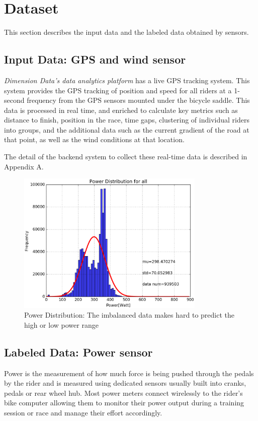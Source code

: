 \documentclass[runningheads]{llncs}
\begin{document}
\section{Dataset}
This section describes the input data and the labeled data obtained by sensors.

\subsection{Input Data: GPS and wind sensor} \label{sec:input_data}
{\it{Dimension Data's data analytics platform}} has a live GPS tracking system. This system provides the GPS tracking of position and speed for all riders at a 1-second frequency from the GPS sensors mounted under the bicycle saddle. This data is processed in real time, and enriched to calculate key metrics such as distance to finish, position in the race, time gaps, clustering of individual riders into groups, and the additional data such as the current gradient of the road at that point, as well as the wind conditions at that location.

The detail of the backend system to collect these real-time data is described in Appendix A.

\begin{figure}[t]
 \begin{center}
  \includegraphics[width=0.8\textwidth]{fig/dist_bib_all.eps}
  \caption{Power Distribution: The imbalanced data makes hard to predict the high or low power range}
  \label{fig:power_distribution}
 \end{center}
\end{figure}

\subsection{Labeled Data: Power sensor}
Power is the measurement of how much force is being pushed through the pedals by the rider and is measured using dedicated sensors usually built into cranks, pedals or rear wheel hub. Most power meters connect wirelessly to the rider's bike computer allowing them to monitor their power output during a training session or race and manage their effort accordingly.
\end{document}
